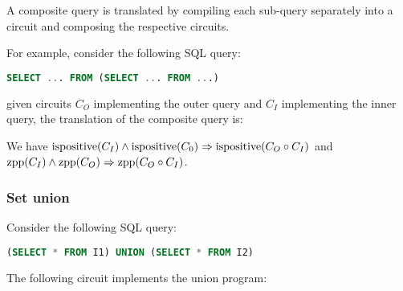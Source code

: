 A composite query is translated by compiling each sub-query separately into a circuit
and composing the respective circuits.

For example, consider the following SQL query:

\begin{lstlisting}[language=SQL]
SELECT ... FROM (SELECT ... FROM ...)
\end{lstlisting}

\noindent given circuits $C_O$ implementing the outer query and $C_I$
implementing the inner query, the translation of the composite query is:

\begin{center}
\end{center}

We have $\mbox{ispositive}(C_I) \land \mbox{ispositive}(C_0) \Rightarrow \mbox{ispositive}(C_O \circ C_I)$
and $\mbox{zpp}(C_I) \land \mbox{zpp}(C_O) \Rightarrow \mbox{zpp}(C_O \circ C_I)$.

\subsubsection{Set union}

Consider the following SQL query:

\begin{lstlisting}[language=SQL]
(SELECT * FROM I1) UNION (SELECT * FROM I2)
\end{lstlisting}

The following circuit implements the union program:

\begin{center}
\end{center}

